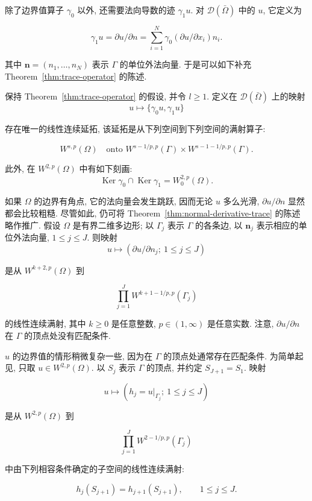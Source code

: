 
除了边界值算子 $\gamma_0$ 以外, 还需要法向导数的迹 $\gamma_1u$. 对 $\mathcal D(\bar\Omega)$ 中的 $u$, 它定义为

\begin{equation}\label{eq:normal-derivative-trace}
\gamma_1u=\partial u/\partial n=\sum_{i=1}^N\gamma_0(\partial u/\partial x_i)n_i.
\end{equation}

其中 $\mathbf n=(n_1,\ldots,n_N)$ 表示 $\Gamma$ 的单位外法向量. 于是可以如下补充
Theorem~\ref{thm:trace-operator} 的陈述.

\setcounter{statement}{5}
\renewcommand{\theHstatement}{theorem.\thesection.\arabic{statement}}
\begin{Theorem}\label{thm:normal-derivative-trace}
保持 Theorem~\ref{thm:trace-operator} 的假设, 并令 $l\geq1$. 定义在 $\mathcal D(\bar\Omega)$ 上的映射
\[
u\mapsto\{\gamma_0u,\gamma_1u\}
\]

存在唯一的线性连续延拓, 该延拓是从下列空间到下列空间的满射算子:

\[
W^{s,p}(\Omega)\quad\text{onto }W^{s-1/p,p}(\Gamma)\times W^{s-1-1/p,p}(\Gamma).
\]

此外, 在 $W^{2,p}(\Omega)$ 中有如下刻画:
\[
\operatorname{Ker}\gamma_0\cap\operatorname{Ker}\gamma_1=W_0^{2,p}(\Omega).
\]
\end{Theorem}

\setcounter{statement}{0}
\renewcommand{\theHstatement}{remark.\thesection.\arabic{statement}}
\begin{Remark}\label{rem:polygon-boundary-traces}
如果 $\Omega$ 的边界有角点, 它的法向量会发生跳跃, 因而无论 $u$ 多么光滑, $\partial u/\partial n$ 显然都会比较粗糙. 尽管如此, 仍可将 Theorem~\ref{thm:normal-derivative-trace} 的陈述略作推广. 假设 $\Omega$ 是有界二维多边形; 以 $\Gamma_j$ 表示 $\Gamma$ 的各条边, 以 $\mathbf n_j$ 表示相应的单位外法向量, $1\leq j\leq J$. 则映射
\[
u\mapsto(\partial u/\partial n_j;\ 1\leq j\leq J)
\]

是从 $W^{k+2,p}(\Omega)$ 到

\[
\prod_{j=1}^J W^{k+1-1/p,p}(\Gamma_j)
\]

的线性连续满射, 其中 $k\geq0$ 是任意整数, $p\in(1,\infty)$ 是任意实数. 注意, $\partial u/\partial n$ 在 $\Gamma$ 的顶点处没有匹配条件.

$u$ 的边界值的情形稍微复杂一些, 因为在 $\Gamma$ 的顶点处通常存在匹配条件. 为简单起见, 只取 $u\in W^{2,p}(\Omega)$. 以 $S_j$ 表示 $\Gamma$ 的顶点, 并约定 $S_{J+1}=S_1$. 映射

\[
u\mapsto(h_j=u|_{\Gamma_j};\ 1\leq j\leq J)
\]

是从 $W^{2,p}(\Omega)$ 到

\[
\prod_{j=1}^J W^{2-1/p,p}(\Gamma_j)
\]

中由下列相容条件确定的子空间的线性连续满射:

\[
h_j(S_{j+1})=h_{j+1}(S_{j+1}),\qquad1\leq j\leq J.
\]
\end{Remark}

